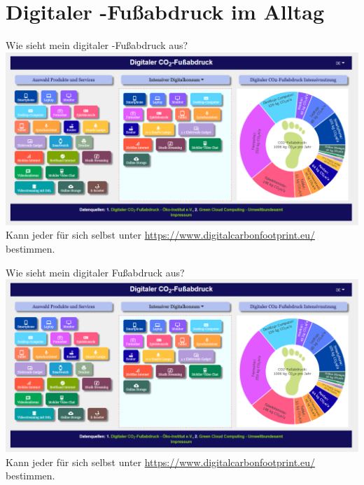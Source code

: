 \section{Digitaler \COz-Fußabdruck im Alltag}

\begin{frame}{Wie sieht mein digitaler \COz-Fußabdruck aus?}
\includegraphics[width=1.00\textwidth]{../Figures/digit_CO2_FussAbruck.png}
Kann jeder für sich selbst unter \href{https://www.digitalcarbonfootprint.eu/}{https://www.digitalcarbonfootprint.eu/} bestimmen.

\end{frame}

\begin{frame}{Wie sieht mein digitaler Fußabdruck aus?}
\includegraphics[width=1.00\textwidth]{../Figures/digit_CO2_FussAbruck.png}
Kann jeder für sich selbst unter \href{https://www.digitalcarbonfootprint.eu/}{https://www.digitalcarbonfootprint.eu/} bestimmen.

\end{frame}


